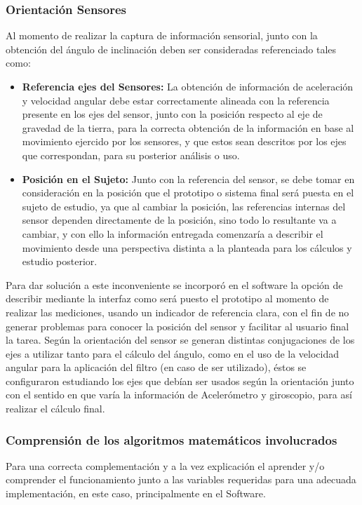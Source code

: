 \documentclass[12pt,a4paper]{article}
\begin{document}
\subsubsection{Orientación Sensores}
Al momento de realizar la captura de información sensorial, junto con la obtención del ángulo de inclinación deben ser consideradas referenciado tales como:
\begin{itemize}
	
	\item \textbf{Referencia ejes del Sensores:} La obtención de información de aceleración y velocidad angular debe estar correctamente alineada con la referencia presente en los ejes del sensor, junto con la posición respecto al eje de gravedad de la tierra, para la correcta obtención de la información en base al movimiento ejercido por los sensores, y que estos sean descritos por los ejes que correspondan, para su posterior análisis o uso.
	
	\item \textbf{Posición en el Sujeto:} Junto con la referencia del sensor, se debe tomar en consideración en la posición que el prototipo o sistema final será puesta en el sujeto de estudio, ya que al cambiar la posición, las referencias internas del sensor dependen directamente de la posición, sino todo lo resultante va a cambiar, y con ello la información entregada comenzaría a describir el movimiento desde una perspectiva distinta a la planteada para los cálculos y estudio posterior.
\end{itemize}

Para dar solución a este inconveniente se incorporó en el software la opción de describir mediante la interfaz como será puesto el prototipo al momento de realizar las mediciones, usando un indicador de referencia clara, con el fin de no generar problemas para conocer la posición del sensor y facilitar al usuario final la tarea.
Según la orientación del sensor se generan distintas conjugaciones de los ejes a utilizar tanto para el cálculo del ángulo, como en el uso de la velocidad angular para la aplicación del filtro (en caso de ser utilizado), éstos se configuraron estudiando los ejes que debían ser usados según la orientación junto con el sentido en que varía la información de Acelerómetro y giroscopio, para así realizar el cálculo final.

\subsubsection{Comprensión de los algoritmos matemáticos involucrados}
Para una correcta complementación y a la vez explicación el aprender y/o comprender el funcionamiento junto a las variables requeridas para una adecuada implementación, en este caso, principalmente en el Software.
\end{document}
